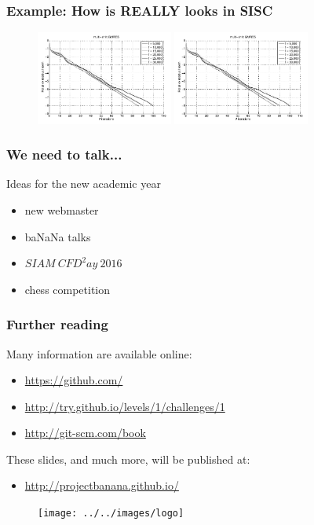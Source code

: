 \documentclass{beamer}
\begin{document}
\begin{frame}
\frametitle{Example: How is REALLY looks in SISC}
\begin{figure}
 \includegraphics[width=0.4\textwidth]{images/matlab_bw.png} \hspace{0.6cm} \includegraphics[width=0.4\textwidth]{images/matlab_bw.png} 
\end{figure}
\end{frame}

\begin{frame}
\frametitle{We need to talk...}
Ideas for the new academic year
\begin{itemize}
 \item new webmaster
 \item baNaNa talks
 \item $SIAM \ CFD^2ay \ 2016$
 \item chess competition 
\end{itemize}
\end{frame}

\begin{frame}
\frametitle{Further reading}
Many information are available online:
\begin{itemize}
 \item \url{https://github.com/}
 \item \url{http://try.github.io/levels/1/challenges/1}
 \item \url{http://git-scm.com/book}
\end{itemize}
These slides, and much more, will be published at:
\begin{itemize}
 \item \url{http://projectbanana.github.io/}
\end{itemize}
 \begin{figure}
\centering
 \texttt{[image: ../../images/logo]}
\end{figure}
\end{frame}
\end{document}
